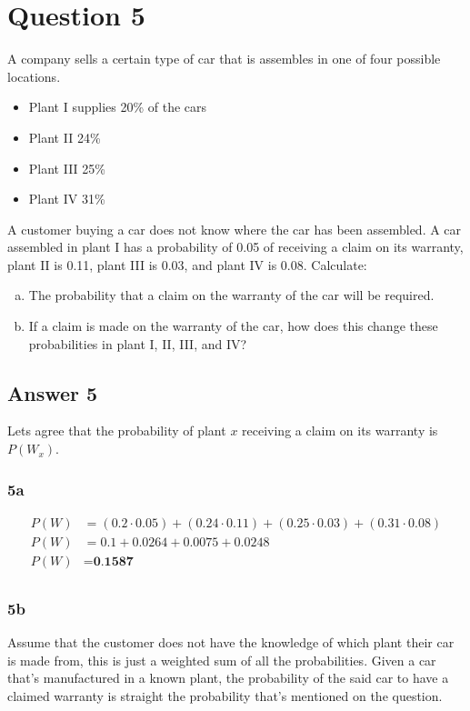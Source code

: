 \documentclass[
	11pt, %
]{assignment}
\begin{document}
\section*{Question 5}
\begin{problem}
A company sells a certain type of car that is assembles in one
of four possible locations.

\medskip

\begin{itemize}
	\item Plant I supplies 20\% of the cars
	\item Plant II 24\%
	\item Plant III 25\%
	\item Plant IV 31\%
\end{itemize}

\medskip

A customer buying a car does not know where the car has been assembled. A car assembled in plant I has a probability of 0.05 of receiving a claim on its warranty, plant II is 0.11, plant III is 0.03, and plant IV is 0.08. Calculate:

\begin{enumerate}[a.]
	\item The probability that a claim on the warranty of the car will be required.
	\item If a claim is made on the warranty of the car, how does this change these probabilities in plant I, II, III, and IV\@?
\end{enumerate}
\end{problem}

\subsection*{Answer 5}

Lets agree that the probability of plant \(x\) receiving a claim on its warranty is \(P(W_x)\).

\subsubsection*{5a}

\[
	\begin{aligned}
		P(W) & = (0.2 \cdot 0.05) + (0.24 \cdot 0.11) + (0.25 \cdot 0.03) + (0.31 \cdot 0.08) \\
		P(W) & = 0.1 + 0.0264 + 0.0075 + 0.0248                                               \\
		P(W) & = \textbf{0.1587}                                                              \\
	\end{aligned}
\]

\subsubsection*{5b}

Assume that the customer does not have the knowledge of which plant their car is made from, this is just a weighted sum of all the probabilities. Given a car that's manufactured in a known plant, the probability of the said car to have a claimed warranty is straight the probability that's mentioned on the question.


\end{document}
